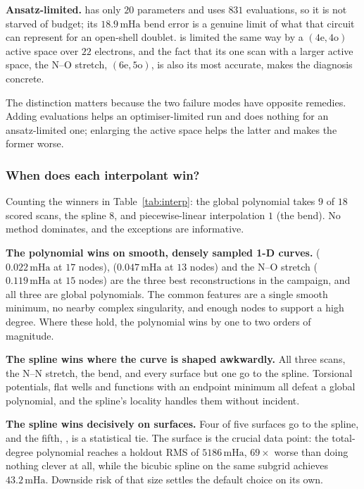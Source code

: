 \documentclass[sigconf,screen,nonacm]{acmart}
\newcommand{\mHa}{\,\text{mHa}}
\begin{document}
\textbf{Ansatz-limited.}  has only $20$ parameters and uses $831$
evaluations, so it is not starved of budget; its $18.9\mHa$ bend error is a
genuine limit of what that circuit can represent for an open-shell doublet.
 is limited the same way by a $(4\text{e},4\text{o})$ active space
over $22$ electrons, and the fact that its one scan with a larger active
space, the N--O stretch, $(6\text{e},5\text{o})$, is also its most accurate,
makes the diagnosis concrete.

The distinction matters because the two failure modes have opposite
remedies. Adding evaluations helps an optimiser-limited run and does nothing
for an ansatz-limited one; enlarging the active space helps the latter and
makes the former worse.

\subsubsection{When does each interpolant win?}

Counting the winners in Table~\ref{tab:interp}: the global polynomial takes
$9$ of $18$ scored scans, the spline $8$, and piecewise-linear interpolation
$1$ (the  bend). No method dominates, and the exceptions are
informative.

\textbf{The polynomial wins on smooth, densely sampled 1-D curves.} 
($0.022\mHa$ at $17$ nodes),  ($0.047\mHa$ at $13$ nodes) and the
 N--O stretch ($0.119\mHa$ at $15$ nodes) are the three best
reconstructions in the campaign, and all three are global polynomials. The
common features are a single smooth minimum, no nearby complex singularity,
and enough nodes to support a high degree. Where these hold, the polynomial
wins by one to two orders of magnitude.

\textbf{The spline wins where the curve is shaped awkwardly.} All three
 scans, the  N--N stretch, the  bend, and every
surface but one go to the spline. Torsional potentials, flat wells and
functions with an endpoint minimum all defeat a global polynomial, and the
spline's locality handles them without incident.

\textbf{The spline wins decisively on surfaces.} Four of five surfaces go to
the spline, and the fifth, , is a statistical tie. The 
surface is the crucial data point: the total-degree polynomial reaches a
holdout RMS of $5186\mHa$, $69\times$ worse than doing nothing clever at all,
while the bicubic spline on the same subgrid achieves $43.2\mHa$. Downside
risk of that size settles the default choice on its own.
\end{document}
